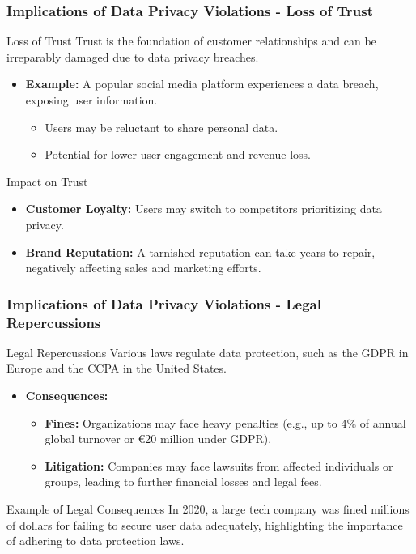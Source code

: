 \documentclass[aspectratio=169]{beamer}
\begin{document}
\begin{frame}[fragile]
    \frametitle{Implications of Data Privacy Violations - Loss of Trust}
    \begin{block}{Loss of Trust}
        Trust is the foundation of customer relationships and can be irreparably damaged due to data privacy breaches.
    \end{block}
    \begin{itemize}
        \item \textbf{Example:} A popular social media platform experiences a data breach, exposing user information. 
        \begin{itemize}
            \item Users may be reluctant to share personal data.
            \item Potential for lower user engagement and revenue loss.
        \end{itemize}
    \end{itemize}
    \begin{block}{Impact on Trust}
        \begin{itemize}
            \item \textbf{Customer Loyalty:} Users may switch to competitors prioritizing data privacy.
            \item \textbf{Brand Reputation:} A tarnished reputation can take years to repair, negatively affecting sales and marketing efforts.
        \end{itemize}
    \end{block}
\end{frame}

\begin{frame}[fragile]
    \frametitle{Implications of Data Privacy Violations - Legal Repercussions}
    \begin{block}{Legal Repercussions}
        Various laws regulate data protection, such as the GDPR in Europe and the CCPA in the United States.
    \end{block}
    \begin{itemize}
        \item \textbf{Consequences:}
        \begin{itemize}
            \item \textbf{Fines:} Organizations may face heavy penalties (e.g., up to 4\% of annual global turnover or €20 million under GDPR).
            \item \textbf{Litigation:} Companies may face lawsuits from affected individuals or groups, leading to further financial losses and legal fees.
        \end{itemize}
    \end{itemize}
    \begin{block}{Example of Legal Consequences}
        In 2020, a large tech company was fined millions of dollars for failing to secure user data adequately, highlighting the importance of adhering to data protection laws.
    \end{block}
\end{frame}
\end{document}
